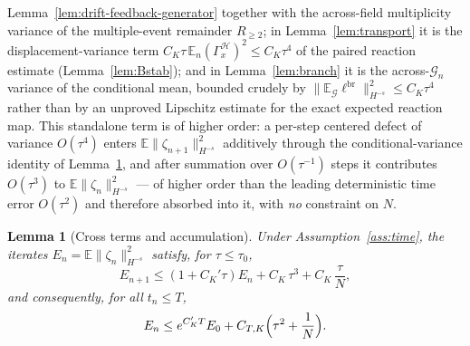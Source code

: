 \documentclass[a4paper,fleqn]{cas-sc}
\newtheorem{lemma}[theorem]{Lemma}
\theoremstyle{definition}
\theoremstyle{remark}
\begin{document}
Lemma~\ref{lem:drift-feedback-generator} together with the across-field
multiplicity variance of the multiple-event remainder $R_{\ge2}$; in Lemma~\ref{lem:transport} it is the
displacement-variance term $C_K\tau\,\mathbb E_n(\Gamma_x^{\mathcal H})^2\le C_K\tau^4$
of the paired reaction estimate (Lemma~\ref{lem:Bstab}); and in
Lemma~\ref{lem:branch} it is the across-$\mathcal G_n$ variance of the conditional
mean, bounded crudely by $\|\mathbb E_{\mathcal G}\ell^{\mathrm{br}}\|_{H^{-s}}^2\le C_K\tau^4$
rather than by an unproved Lipschitz estimate for the exact expected reaction map.
This standalone term is of higher order: a per-step centered defect of variance
$O(\tau^4)$ enters $\mathbb E\|\zeta_{n+1}\|_{H^{-s}}^2$ additively through the
conditional-variance identity of Lemma~\ref{lem:accum}, and after summation over
$O(\tau^{-1})$ steps it contributes $O(\tau^3)$ to $\mathbb E\|\zeta_n\|_{H^{-s}}^2$ ---
of higher order than the leading deterministic time error $O(\tau^2)$ and therefore
absorbed into it, with \emph{no} constraint on $N$.

\begin{lemma}[Cross terms and accumulation]\label{lem:accum}
Under Assumption~\ref{ass:time}, the iterates $E_n=\mathbb E\|\zeta_n\|_{H^{-s}}^2$
satisfy, for $\tau\le\tau_0$,
\[
E_{n+1}\le(1+C_K'\tau)E_n+C_K\,\tau^3+C_K\,\frac{\tau}{N},
\]
and consequently, for all $t_n\le T$,
\[
E_n\le e^{C_K'T}E_0+C_{T,K}\Bigl(\tau^2+\frac{1}{N}\Bigr).
\]
\end{lemma}
\end{document}
